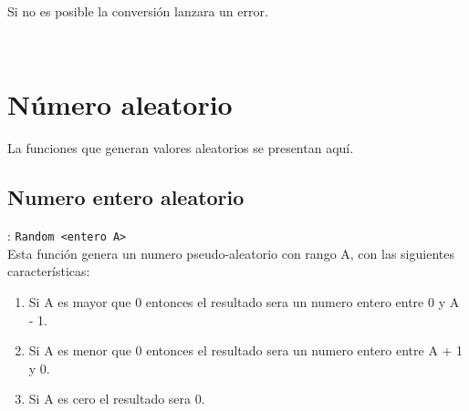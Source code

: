       Si no es posible la conversión lanzara un error.
      
      \begin{fxcode}
         \\
      \end{fxcode}
      
   \section{Número aleatorio}
      La funciones que generan valores aleatorios se presentan aquí.
      
      \subsection*{Numero entero aleatorio}: \texttt{Random <entero A>}\\
      Esta función genera un numero pseudo-aleatorio con rango A, con las siguientes características:
      \begin{enumerate}
         \item Si A es mayor que 0 entonces el resultado sera un numero entero entre 0 y A - 1.
         \item Si A es menor que 0 entonces el resultado sera un numero entero entre A + 1 y 0.
         \item Si A es cero el resultado sera 0.
      \end{enumerate}
      
      \begin{fxcode}
         \\
         \\
         \\
      \end{fxcode}
      
      
   
   
   
   
   
   
   
   
   